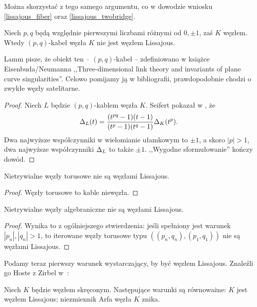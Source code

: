 Można skorzystać z tego samego argumentu, co w dowodzie wniosku \ref{lissajous_fiber} oraz \ref{lissajous_twobridge}.

\begin{proposition}
	Niech $p, q$ będą względnie pierwszymi liczbami różnymi od $0, \pm 1$, zaś $K$ węzłem.
	Wtedy $(p, q)$-kabel węzła $K$ nie jest węzłem Lissajous.
\end{proposition}

Lamm pisze, że obiekt ten -- $(p, q)$-kabel -- zdefiniowano w książce Eisenbuda/Neumanna ,,Three-dimensional link theory and invariants of plane curve singularities''.
Celowo pomijamy ją w bibliografii, prawdopodobnie chodzi o zwykłe węzły satelitarne.

\begin{proof}
	Niech $L$ będzie $(p, q)$-kablem węzła $K$.
	Seifert pokazał w \cite{seifert50}, że
    \begin{equation}
    	\Delta_L(t) = \frac{(t^{pq}-1)(t-1)}{(t^p-1)(t^q-1)} \Delta_K(t^p).
    \end{equation}
    Dwa najwyższe współczynniki w wielomianie ułamkowym to $\pm 1$, a skoro $|p| > 1$, dwa najwyższe współczynniki $\Delta_L$ to także $\pm 1$.
    ,,Wygodne sformułowanie'' kończy dowód.
\end{proof}

\begin{corollary}
    Nietrywialne węzły torusowe nie są węzłami Lissajous.
\end{corollary}

\begin{proof}
	Węzły torusowe to kable niewęzła.
\end{proof}

\begin{corollary}
    Nietrywialne węzły algebraniczne nie są węzłami Lissajous.
\end{corollary}

\begin{proof}
	Wynika to z ogólniejszego stwierdzenia: jeśli spełniony jest warunek $|p_n|, |q_n| > 1$, to iterowane węzły torusowe typu $((p_n, q_n), (p_1, q_1))$ nie są węzłami Lissajous.
\end{proof}

Podamy teraz pierwszy warunek wystarczający, by być węzłem Lissajous.
Znaleźli go Hoste z Zirbel w~\cite{zirbel06}:

\begin{proposition}
	Niech $K$ będzie węzłem skręconym.
	Następujące warunki są równoważne: $K$ jest węzłem Lissajous; niezmiennik Arfa węzła $K$ znika.
\end{proposition}

